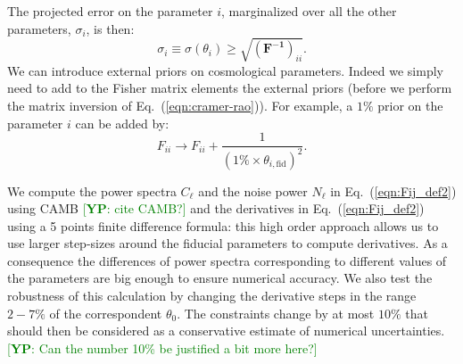 \documentclass[aps,prd,reprint,superscriptaddress]{revtex4-1}
\newcommand{\yp}[1]{\textcolor{green}{[{\bf YP}: #1]}}
\newcommand\refeq[1]{Eq.~(\ref{eqn:#1})}
\begin{document}
The projected error on the parameter $i$, marginalized over all the other parameters, $\sigma_i$, is then:
\begin{equation}
\sigma_i \equiv \sigma (\theta_i) \geq \sqrt{(\mathbf{ F^{-1}})_{ii}}.
\label{eqn:cramer-rao}
\end{equation}
We can introduce external priors on cosmological parameters.
Indeed we simply need to add to the Fisher matrix elements the external priors (before we perform the matrix inversion of \refeq{cramer-rao}).
For example, a $1\%$ prior on the parameter $i$ can be added by:
\begin{equation}
F_{ii} \rightarrow F_{ii} + \frac{1}{(1\% \times  \theta_{i,\text{fid}})^2}.
\end{equation}


We compute the power spectra $C_{\ell}$ and the noise power $N_{\ell}$ in \refeq{Fij_def2} using CAMB \yp{cite CAMB?} and
the derivatives in \refeq{Fij_def2} using a 5 points finite difference formula:
this high order approach allows us to use larger step-sizes around the fiducial parameters to compute derivatives. As a consequence the differences of power spectra corresponding to different values of the parameters are big enough to ensure numerical accuracy. %
We also test the robustness of this calculation by changing the derivative steps in the range $2-7\%$ of the correspondent $\theta_{0}$. The constraints change by at most $10\%$ that should then be considered as a conservative estimate of numerical uncertainties. \yp{Can the number 10\% be justified a bit more here?}
\end{document}
